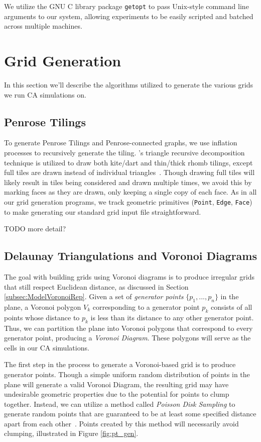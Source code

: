 \documentclass[a4paper,11pt]{report}
\begin{document}
We utilize the GNU C library package \texttt{getopt} to pass Unix-style command line arguments to our system, allowing experiments to be easily scripted and batched across multiple machines.

\section{Grid Generation}
\label{sec:GridGen}

In this section we'll describe the algorithms utilized to generate the various grids we run CA simulations on.

\subsection{Penrose Tilings}
To generate Penrose Tilings and Penrose-connected graphs, we use inflation processes to recursively generate the tiling. \citeauthor{ro71}'s triangle recursive decomposition technique is utilized to draw both kite/dart and thin/thick rhomb tilings, except full tiles are drawn instead of individual triangles~\cite{ro71}. Though drawing full tiles will likely result in tiles being considered and drawn multiple times, we avoid this by marking faces as they are drawn, only keeping a single copy of each face. As in all our grid generation programs, we track geometric primitives (\texttt{Point}, \texttt{Edge}, \texttt{Face}) to make generating our standard grid input file straightforward.

TODO more detail?

\subsection{Delaunay Triangulations and Voronoi Diagrams}
The goal with building grids using Voronoi diagrams is to produce irregular grids that still respect Euclidean distance, as discussed in Section \ref{subsec:ModelVoronoiRep}. Given a set of \textit{generator points} $\{p_1, ..., p_n\}$ in the plane, a Voronoi polygon $V_k$ corresponding to a generator point $p_k$ consists of all points whose distance to $p_k$ is less than its distance to any other generator point. Thus, we can partition the plane into Voronoi polygons that correspond to every generator point, producing a \textit{Voronoi Diagram}. These polygons will serve as the cells in our CA simulations. 

The first step in the process to generate a Voronoi-based grid is to produce generator points. Though a simple uniform random distribution of points in the plane will generate a valid Voronoi Diagram, the resulting grid may have undesirable geometric properties due to the potential for points to clump together. Instead, we can utilize a method called \textit{Poisson Disk Sampling} to generate random points that are guaranteed to be at least some specified distance apart from each other~\cite{br07}. Points created by this method will necessarily avoid clumping, illustrated in Figure \ref{fig:pt_gen}.
\end{document}
